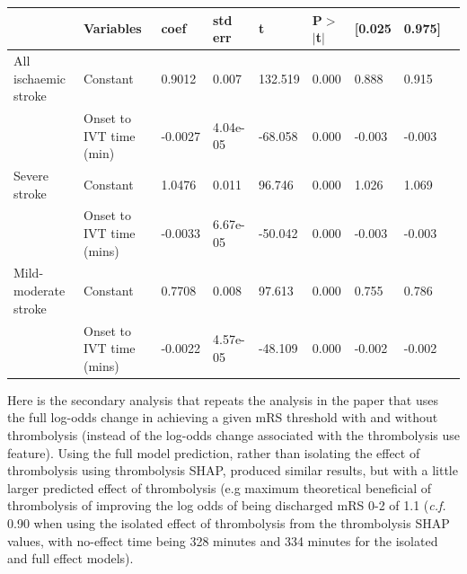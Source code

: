 \begin{table}[!ht]
    \centering
        \begin{tabular}{lllllllll}
        \toprule
         & Variables & coef & std err & t & P$>$$|$t$|$ & [0.025 & 0.975] \\ 
         \midrule
        All ischaemic stroke & Constant & 0.9012 & 0.007 & 132.519 & 0.000 & 0.888 & 0.915\\
        & Onset to IVT time (min) &  -0.0027  & 4.04e-05 & -68.058 & 0.000 & -0.003 & -0.003\\   
        \midrule
        Severe stroke & Constant & 1.0476  &    0.011  & 96.746 & 0.000 & 1.026 & 1.069\\
        & Onset to IVT time (mins) & -0.0033 &  6.67e-05  & -50.042 & 0.000 & -0.003 & -0.003\\ 
        \midrule
        Mild-moderate stroke & Constant &           0.7708 &     0.008   & 97.613 & 0.000 & 0.755 & 0.786\\
        & Onset to IVT time (mins) &  -0.0022 &   4.57e-05 & -48.109 & 0.000 & -0.002 & -0.002\\
        \bottomrule
        \end{tabular}

      \label{fig:stats_table_mrs1}
   
\end{table}


Here is the secondary analysis that repeats the analysis in the paper that uses the full log-odds change in achieving a given mRS threshold with and without thrombolysis (instead of the log-odds change associated with the thrombolysis use feature). Using the full model prediction, rather than isolating the effect of thrombolysis using thrombolysis SHAP, produced similar results, but with a little larger predicted effect of thrombolysis (e.g  maximum theoretical beneficial of thrombolysis of improving the log odds of being discharged mRS 0-2 of 1.1 (\textit{c.f.} 0.90 when using the isolated effect of thrombolysis from the thrombolysis SHAP values, with no-effect time being 328 minutes and 334 minutes for the isolated and full effect models).

